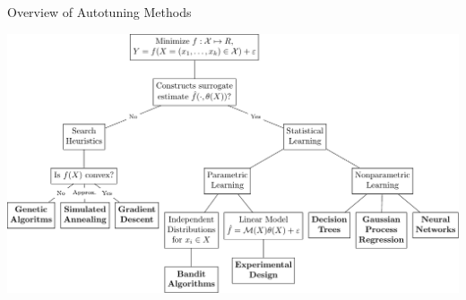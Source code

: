 \documentclass[10pt, compress, aspectratio=169, xcolor={table,usenames,dvipsnames}]{beamer}
\begin{document}
\begin{frame}[label={sec:org2d72062}]{Overview of Autotuning Methods}
\begin{center}
\includegraphics[width=.92\columnwidth]{../../../img/simplest_tree.pdf}
\end{center}
\end{frame}
\end{document}
